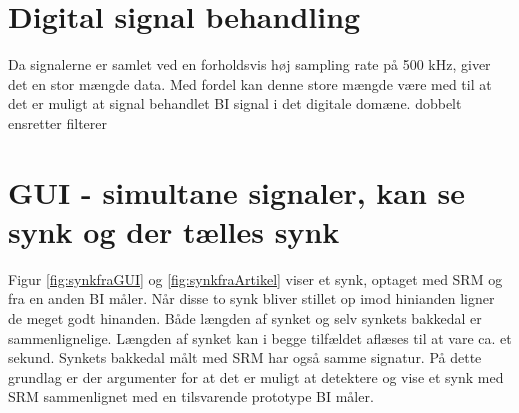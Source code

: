 \section{Digital signal behandling}
Da signalerne er samlet ved en forholdsvis høj sampling rate på 500 kHz, giver det en stor mængde data. Med fordel kan denne store mængde være med til at det er muligt at signal behandlet BI signal i det digitale domæne.
dobbelt ensretter
filterer

\section{GUI - simultane signaler, kan se synk og der tælles synk}

Figur \ref{fig:synkfraGUI} og \ref{fig:synkfraArtikel} viser et synk, optaget med SRM og fra en anden BI måler. Når disse to synk bliver stillet op imod hinianden ligner de meget godt hinanden. Både længden af synket og selv synkets bakkedal er sammenlignelige. Længden af synket kan i begge tilfældet aflæses til at vare ca. et sekund. Synkets bakkedal målt med SRM har også samme signatur. På dette grundlag er der argumenter for at det er muligt at detektere og vise et synk med SRM sammenlignet med en tilsvarende prototype BI måler.

